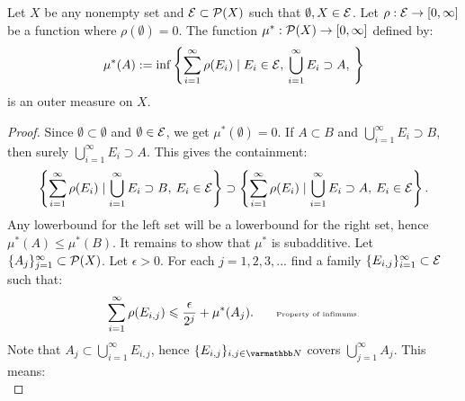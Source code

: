     \begin{proposition}\label{prop:outermeasure}
        Let $X$ be any nonempty set and $\cE \subset \cP(X)$ such that $\emptyset,X \in \cE$. Let $\rho:\cE \rightarrow [0,\infty]$ be a function where $\rho(\emptyset) = 0$. The function $\mu^\ast: \cP(X) \rightarrow [0,\infty]$ defined by:
            \begin{equation*}
            \begin{split}
                \mu^\ast(A) := \inf\left\{\sum_{i = 1}^\infty \rho(E_i) \mid E_i \in \cE, \h2 \bigcup_{i = 1}^\infty E_i \supset A, \h2 \right\}
            \end{split}
            \end{equation*}
        is an outer measure on $X$.
    \end{proposition}
        \begin{proof}
            Since $\emptyset \subset \emptyset$ and $\emptyset \in \cE$, we get $\mu^\ast(\emptyset) = 0$. If $A \subset B$ and $\bigcup_{i = 1}^\infty E_i \supset B$, then surely $\bigcup_{i = 1}^\infty E_i \supset A$. This gives the containment:
                \begin{equation*}
                \begin{split}
                    \left\{\sum_{i = 1}^\infty \rho(E_i) \mid \bigcup_{i = 1}^\infty E_i \supset B, \h2 E_i \in \cE\right\} \supset \left\{ \sum_{i = 1}^\infty \rho(E_i) \mid \bigcup_{i = 1}^\infty E_i \supset A , \h2 E_i \in \cE\right\}.
                \end{split}
                \end{equation*}
            Any lowerbound for the left set will be a lowerbound for the right set, hence $\mu^\ast(A) \leq \mu^\ast(B)$. It remains to show that $\mu^\ast$ is subadditive. Let $\{A_j\}_{j = 1}^\infty \subset \cP(X)$. Let $\epsilon > 0$. For each $j = 1,2,3,...$ find a family $\{E_{i,j}\}_{i = 1}^\infty \subset \cE$ such that:
                \begin{equation*}
                \begin{split}
                    \sum_{i = 1}^\infty \rho(E_{i,j}) \leq \frac{\epsilon}{2^j} + \mu^\ast(A_j). \h9\h9\text{\tiny Property of infimums.}
                \end{split}
                \end{equation*}
            Note that $A_j \subset \bigcup_{i = 1}^\infty E_{i,j}$, hence $\{E_{i,j}\}_{i,j \in \bfN}$ covers $\bigcup_{j = 1}^\infty A_j$. This means:
                \begin{equation*}

\end{equation*}
\end{proof}
